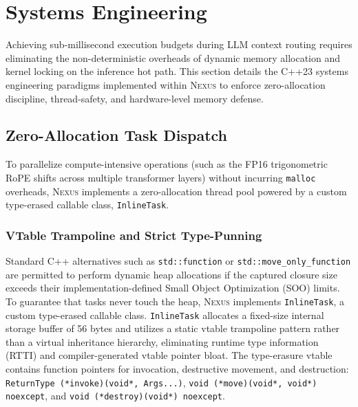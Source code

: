 \documentclass[conference,10pt]{IEEEtran}
\newcommand{\Nexus}{\textsc{Nexus}\xspace}
\begin{document}
\section{Systems Engineering}
\label{sec:systems}

Achieving sub-millisecond execution budgets during LLM context routing requires eliminating the non-deterministic overheads of dynamic memory allocation and kernel locking on the inference hot path. This section details the C++23 systems engineering paradigms implemented within \Nexus to enforce zero-allocation discipline, thread-safety, and hardware-level memory defense.

\subsection{Zero-Allocation Task Dispatch}
\label{subsec:sys-dispatch}

To parallelize compute-intensive operations (such as the FP16 trigonometric RoPE shifts across multiple transformer layers) without incurring \texttt{malloc} overheads, \Nexus implements a zero-allocation thread pool powered by a custom type-erased callable class, \texttt{InlineTask}.

\subsubsection{VTable Trampoline and Strict Type-Punning}
Standard C++ alternatives such as \texttt{std::function} or \texttt{std::move\_only\_function} are permitted to perform dynamic heap allocations if the captured closure size exceeds their implementation-defined Small Object Optimization (SOO) limits. To guarantee that tasks never touch the heap, \Nexus implements \texttt{InlineTask}, a custom type-erased callable class. \texttt{InlineTask} allocates a fixed-size internal storage buffer of 56 bytes and utilizes a static vtable trampoline pattern rather than a virtual inheritance hierarchy, eliminating runtime type information (RTTI) and compiler-generated vtable pointer bloat. The type-erasure vtable contains function pointers for invocation, destructive movement, and destruction: \texttt{ReturnType (*invoke)(void*, Args...)}, \texttt{void (*move)(void*, void*) noexcept}, and \texttt{void (*destroy)(void*) noexcept}.
\end{document}

